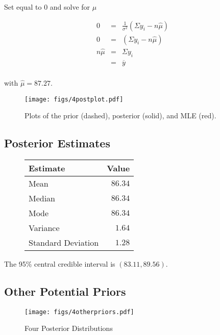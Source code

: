 \documentclass[12pt]{article}
\newcommand{\ybar}{\overline{y}}
\begin{document}
\noindent Set equal to 0 and solve for $\hat{\mu}$

\begin{eqnarray*}
0 &=& \frac{1}{\sigma^2}(\Sigma y_i-n\hat{\mu}) \\
0 &=& (\Sigma y_i-n\hat{\mu}) \\
n\hat{\mu} &=& \Sigma y_i \\
&=& \ybar \\
\end{eqnarray*}

\noindent with $\hat{\mu}=87.27$.

\begin{figure}[H]
\begin{center}
\texttt{[image: figs/4postplot.pdf]}
\caption{Plots of the prior (dashed), posterior (solid), and MLE (red).}
\end{center}
\end{figure}

\subsection{Posterior Estimates}

\begin{figure}[H]
\begin{center}
\begin{tabular}{l|r}
Estimate & \multicolumn{1}{l}{Value} \\ \hline \hline
Mean               & $86.34$ \\
Median             & $86.34$ \\
Mode               & $86.34$ \\
Variance           & $1.64$ \\
Standard Deviation & $1.28$ \\
\end{tabular}
\end{center}
\end{figure}

\noindent The 95\% central credible interval is $(83.11, 89.56)$.


\subsection{Other Potential Priors}

\begin{figure}[H]
\begin{center}
\texttt{[image: figs/4otherpriors.pdf]}
\caption{Four Posterior Distributions}
\end{center}
\end{figure}
\end{document}
